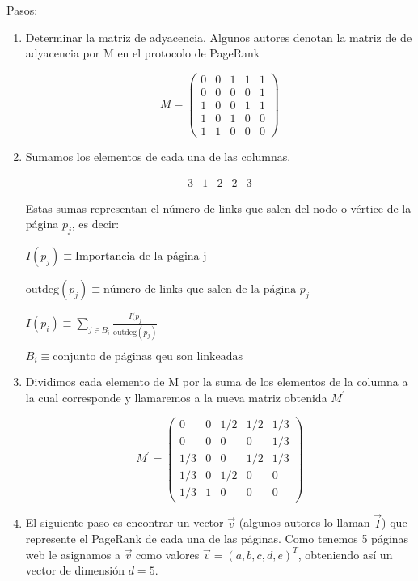 Pasos:
\begin{enumerate}
\item Determinar la matriz de adyacencia. Algunos autores denotan la matriz de de adyacencia por M en el protocolo de PageRank

\[
M = \begin{pmatrix}
0 & 0 & 1 & 1 & 1 \\
0 & 0 & 0 & 0 & 1 \\
1 & 0 & 0 & 1 & 1 \\
1 & 0 & 1 & 0 & 0 \\
1 & 1 & 0 & 0 & 0
\end{pmatrix}
\]

\item Sumamos los elementos de cada una de las columnas.

\[
\begin{matrix}
3 & 1 & 2 & 2 & 3
\end{matrix}
\]

Estas sumas representan el número de links que salen del nodo o vértice de la página $p_j$, es decir: 

$I(p_j) \equiv \text{Importancia de la página j}$

$\mathrm{outdeg}(p_j) \equiv \text{número de links que salen de la página } p_j$

$I(p_i) \equiv \sum\limits_{j \in B_i} \frac{I(p_j}{\mathrm{outdeg}(p_j)}$

$B_i \equiv \text{conjunto de páginas qeu son linkeadas}$

\item Dividimos cada elemento de M por la suma de los elementos de la columna a la cual corresponde y llamaremos a la nueva matriz obtenida $M^\prime$

\[
M^\prime = \begin{pmatrix}
0 & 0 & 1/2 & 1/2 & 1/3 \\
0 & 0 & 0 & 0 & 1/3 \\
1/3 & 0 & 0 & 1/2 & 1/3 \\
1/3 & 0 & 1/2 & 0 & 0 \\
1/3 & 1 & 0 & 0 & 0
\end{pmatrix}
\]

\item El siguiente paso es encontrar un vector $\vec{v}$ (algunos autores lo llaman $\vec{I}$) que represente el PageRank de cada una de las páginas. Como tenemos 5 páginas web le asignamos a $\vec{v}$ como valores $\vec{v} = (a,b,c,d,e)^T$, obteniendo así un vector de dimensión $d=5$.


\end{enumerate}
